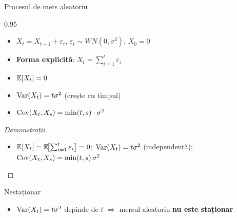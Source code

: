 \documentclass[9pt, aspectratio=169, t]{beamer}
\begin{document}
\begin{frame}{Procesul de mers aleatoriu}
    \begin{cminipage}{0.95\textwidth}
        \small
        \vspace{-3mm}
        \begin{defn}
            \begin{itemize}\setlength{\itemsep}{0pt}
                \item $X_t = X_{t-1} + \varepsilon_t$, \; $\varepsilon_t \sim WN(0, \sigma^2)$, $X_0 = 0$
                \item \textbf{Forma explicită}: $X_t = \sum_{i=1}^{t} \varepsilon_i$
            \end{itemize}
        \end{defn}
        \vspace{-2mm}
        {\footnotesize
        \begin{prop}[Proprietăți]
            \begin{itemize}\setlength{\itemsep}{0pt}
                \item $\mathbb{E}[X_t] = 0$
                \item $\text{Var}(X_t) = t\sigma^2$ (crește cu timpul)
                \item $\text{Cov}(X_t, X_s) = \min(t, s) \cdot \sigma^2$
            \end{itemize}
        \end{prop}
        }
        \vspace{-2mm}
        {\scriptsize
        \begin{proof}[Demonstrații]
            \begin{itemize}\setlength{\itemsep}{0pt}
                \item $\mathbb{E}[X_t] = \mathbb{E}\!\bigl[\sum_{i=1}^{t} \varepsilon_i\bigr] = 0$; \;
                      $\text{Var}(X_t) = t\sigma^2$ (independență); \;
                      $\text{Cov}(X_t, X_s) = \min(t,s)\,\sigma^2$
            \end{itemize}
        \end{proof}
        }
        \vspace{-4mm}
        \begin{alertblock}{Nestaționar}
            \begin{itemize}\setlength{\itemsep}{0pt}
                \item $\text{Var}(X_t) = t\sigma^2$ depinde de $t$ $\Rightarrow$ mersul aleatoriu \textbf{nu este staționar}
            \end{itemize}
        \end{alertblock}
    \end{cminipage}
\end{frame}
\end{document}
